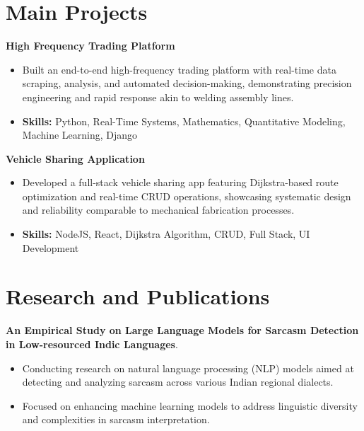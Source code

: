 \documentclass[a4paper,11pt]{article}
\begin{document}
\section{\textbf{Main Projects}}

\vspace{1mm}
  \textbf{High Frequency Trading Platform  }
\vspace{-1.5mm} %
\begin{itemize}
  \item Built an end-to-end high-frequency trading platform with real-time data scraping, analysis, and automated decision-making, demonstrating precision engineering and rapid response akin to welding assembly lines.
\vspace{-3mm}
  \item \textbf{Skills:} Python, Real-Time Systems, Mathematics, Quantitative Modeling, Machine Learning, Django
\end{itemize}


\vspace{1mm}
   \textbf{Vehicle Sharing Application }
\vspace{-1.5mm} %
\begin{itemize}
  \item Developed a full-stack vehicle sharing app featuring Dijkstra-based route optimization and real-time CRUD operations, showcasing systematic design and reliability comparable to mechanical fabrication processes.
\vspace{-3mm}
  \item \textbf{Skills:} NodeJS, React, Dijkstra Algorithm, CRUD, Full Stack, UI Development
\end{itemize}



\section{\textbf{Research and Publications} \hfill }
\vspace{1mm}
  \textbf{An Empirical Study on Large Language Models for Sarcasm Detection in Low-resourced Indic Languages}.
\vspace{-1mm} %
\begin{itemize}
  \item Conducting research on natural language processing (NLP) models aimed at detecting and analyzing sarcasm across various Indian regional dialects.
\vspace{-3mm}
  \item Focused on enhancing machine learning models to address linguistic diversity and complexities in sarcasm interpretation.
\end{itemize}
\end{document}
